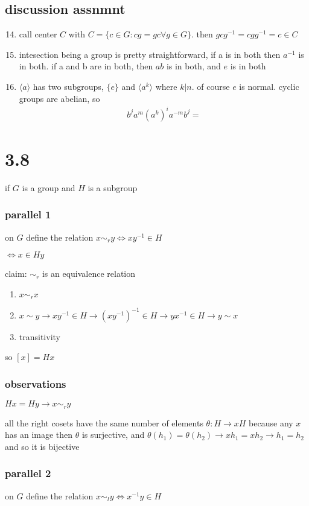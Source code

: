 \documentclass[letterpaper]{article}
\begin{document}
\subsection*{discussion assnmnt}
\begin{enumerate}
\setcounter{enumi}{13}
\item
call center $C$ with $C=\{c\in G:cg=gc\forall g\in G\}$. then $gcg^{-1}=cgg^{-1}=c\in C$
\item
intesection being a group is pretty straightforward, if a is in both then $a^{-1}$ is in both. if a and b are in both, then $ab$ is in both, and $e$ is in both
\setcounter{enumi}{17}
\item
$\langle a\rangle$ has two subgroups, $\{e\}$ and $\langle a^k\rangle$ where $k|n$. of course $e$ is normal. cyclic groups are abelian, so
\begin{align*}
  b^ja^m(a^k)^ia^{-m}b^j=
\end{align*}
\end{enumerate}
\section*{3.8}
if $G$ is a group and $H$ is a subgroup

\subsubsection*{parallel 1}
on $G$ define the relation $x\sim_ry\Leftrightarrow xy^{-1}\in H$

$\Leftrightarrow x\in Hy$

claim: $\sim_r$ is an equivalence relation
\begin{enumerate}
\item
$x\sim_r x$
\item
$x\sim y\to xy^{-1}\in H\to (xy^{-1})^{-1}\in H\to yx^{-1}\in H\to y\sim x$
\item
transitivity
\end{enumerate}
so $[x]=Hx$
\subsubsection*{observations}
$Hx=Hy\to x\sim_r y$

all the right cosets have the same number of elements
$\theta:H\to xH$ because any $x$ has an image then $\theta$ is surjective, and $\theta(h_1)=\theta(h_2)\to xh_1=xh_2\to h_1=h_2$ and so it is bijective
\subsubsection*{parallel 2}
on $G$ define the relation $x\sim_ly\Leftrightarrow x^{-1}y\in H$
\end{document}
